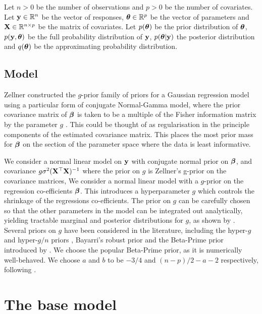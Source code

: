 
Let $n > 0$ be the number of observations and $p > 0$ be the number of covariates. Let ${\bf y} \in {\mathbb{R}}^n$ be the
vector of responses, ${\boldsymbol \theta} \in {\mathbb{R}}^p$ be the vector of parameters and ${\bf X} \in {\mathbb{R}}^{n \times p}$ be the
matrix of covariates. Let $p({\boldsymbol \theta})$ be the prior distribution of ${\boldsymbol \theta}$, $p({\bf y}, {\boldsymbol \theta})$ be the full
probability distribution of ${\bf y}$, $p({\boldsymbol \theta} | {\bf y})$ the posterior distribution and $q({\boldsymbol \theta})$ be the
approximating probability distribution. 

\subsection{Model}
\label{sec:model}

Zellner constructed the $g$-prior family of priors for a Gaussian regression model using a particular form of
conjugate Normal-Gamma model, where the prior covariance matrix of ${\boldsymbol \beta}$ is taken to be a multiple of the
Fisher information  matrix by the parameter $g$ \citep{Zellner1986}. This could be thought of as regularisation
in the principle components of the estimated covariance matrix. This places the most prior mass for ${\boldsymbol \beta}$
on the section of the parameter space where the data is least informative.

We consider a normal linear model on ${\bf y}$ with conjugate normal prior on ${\boldsymbol \beta}$, and covariance $g \sigma^2
({\bf X}^\top {\bf X})^{-1}$ where the prior on $g$ is Zellner's g-prior on the covariance matrices, 
We consider a normal linear model with a $g$-prior on the regression co-efficients ${\boldsymbol \beta}$.
This introduces a hyperparameter $g$ which controls the shrinkage of the regressions co-efficients.
The prior on $g$ can be carefully chosen so that the other parameters in the model can be integrated out
analytically, yielding tractable marginal and posterior distributions for $g$, as shown by \citep{Liang2008}.
Several priors on $g$ have been considered in the literature, including the hyper-$g$ and hyper-$g/n$ priors
\cite{Liang2008}, Bayarri's robust prior \cite{Bayarri2012} and the Beta-Prime prior introduced by
\citep{Maruyama2011}. We choose the popular Beta-Prime prior, as it is numerically well-behaved. 
We choose $a$  and $b$ to be $-3/4$ and $(n - p)/2 - a - 2$ respectively, following \citep{Maruyama2011}.

\section{The base model}
\label{sec:model}

